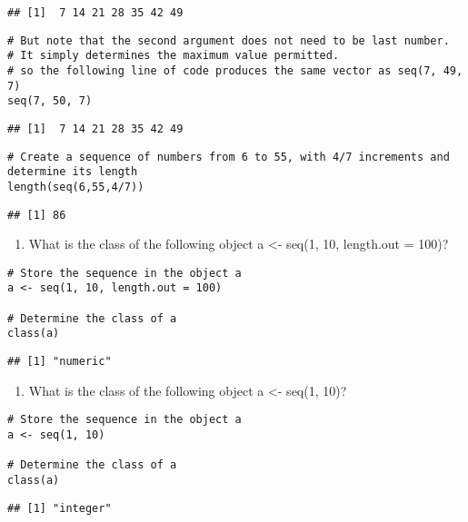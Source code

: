 \documentclass[
]{article}
\providecommand{\tightlist}{%
  \setlength{\itemsep}{0pt}\setlength{\parskip}{0pt}}
\begin{document}
\begin{verbatim}
## [1]  7 14 21 28 35 42 49
\end{verbatim}

\begin{verbatim}
# But note that the second argument does not need to be last number.
# It simply determines the maximum value permitted.
# so the following line of code produces the same vector as seq(7, 49, 7)
seq(7, 50, 7)
\end{verbatim}

\begin{verbatim}
## [1]  7 14 21 28 35 42 49
\end{verbatim}

\begin{verbatim}
# Create a sequence of numbers from 6 to 55, with 4/7 increments and determine its length
length(seq(6,55,4/7))
\end{verbatim}

\begin{verbatim}
## [1] 86
\end{verbatim}

\begin{enumerate}
\def\labelenumi{\arabic{enumi}.}
\setcounter{enumi}{8}
\tightlist
\item
  What is the class of the following object a \textless- seq(1, 10,
  length.out = 100)?
\end{enumerate}

\begin{verbatim}
# Store the sequence in the object a
a <- seq(1, 10, length.out = 100)

# Determine the class of a
class(a)
\end{verbatim}

\begin{verbatim}
## [1] "numeric"
\end{verbatim}

\begin{enumerate}
\def\labelenumi{\arabic{enumi}.}
\setcounter{enumi}{9}
\tightlist
\item
  What is the class of the following object a \textless- seq(1, 10)?
\end{enumerate}

\begin{verbatim}
# Store the sequence in the object a
a <- seq(1, 10)

# Determine the class of a
class(a)
\end{verbatim}

\begin{verbatim}
## [1] "integer"
\end{verbatim}
\end{document}

